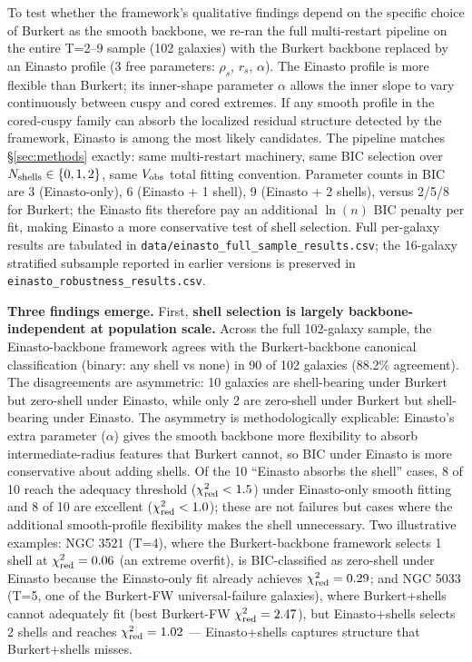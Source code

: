 To test whether the framework's qualitative findings depend on the specific choice of Burkert as the smooth backbone, we re-ran the full multi-restart pipeline on the entire T=2--9 sample (102 galaxies) with the Burkert backbone replaced by an Einasto profile \citep{Einasto1965, Navarro2004} (3 free parameters: $\rho_s$, $r_s$, $\alpha$). The Einasto profile is more flexible than Burkert; its inner-shape parameter $\alpha$ allows the inner slope to vary continuously between cuspy and cored extremes. If any smooth profile in the cored-cuspy family can absorb the localized residual structure detected by the framework, Einasto is among the most likely candidates. The pipeline matches \S\ref{sec:methods} exactly: same multi-restart machinery, same BIC selection over $N_{\rm shells} \in \{0, 1, 2\}$, same $V_{\rm obs}$ total fitting convention. Parameter counts in BIC are 3 (Einasto-only), 6 (Einasto + 1 shell), 9 (Einasto + 2 shells), versus 2/5/8 for Burkert; the Einasto fits therefore pay an additional $\ln(n)$ BIC penalty per fit, making Einasto a more conservative test of shell selection. Full per-galaxy results are tabulated in \texttt{data/einasto\_full\_sample\_results.csv}; the 16-galaxy stratified subsample reported in earlier versions is preserved in \texttt{einasto\_robustness\_results.csv}.

\textbf{Three findings emerge.} First, \textbf{shell selection is largely backbone-independent at population scale.} Across the full 102-galaxy sample, the Einasto-backbone framework agrees with the Burkert-backbone canonical classification (binary: any shell vs none) in 90 of 102 galaxies (88.2\% agreement). The disagreements are asymmetric: 10 galaxies are shell-bearing under Burkert but zero-shell under Einasto, while only 2 are zero-shell under Burkert but shell-bearing under Einasto. The asymmetry is methodologically explicable: Einasto's extra parameter ($\alpha$) gives the smooth backbone more flexibility to absorb intermediate-radius features that Burkert cannot, so BIC under Einasto is more conservative about adding shells. Of the 10 ``Einasto absorbs the shell'' cases, 8 of 10 reach the adequacy threshold ($\chi^2_{\rm red} < 1.5$) under Einasto-only smooth fitting and 8 of 10 are excellent ($\chi^2_{\rm red} < 1.0$); these are not failures but cases where the additional smooth-profile flexibility makes the shell unnecessary. Two illustrative examples: NGC 3521 (T=4), where the Burkert-backbone framework selects 1 shell at $\chi^2_{\rm red} = 0.06$ (an extreme overfit), is BIC-classified as zero-shell under Einasto because the Einasto-only fit already achieves $\chi^2_{\rm red} = 0.29$; and NGC 5033 (T=5, one of the Burkert-FW universal-failure galaxies), where Burkert+shells cannot adequately fit (best Burkert-FW $\chi^2_{\rm red} = 2.47$), but Einasto+shells selects 2 shells and reaches $\chi^2_{\rm red} = 1.02$ --- Einasto+shells captures structure that Burkert+shells misses.

